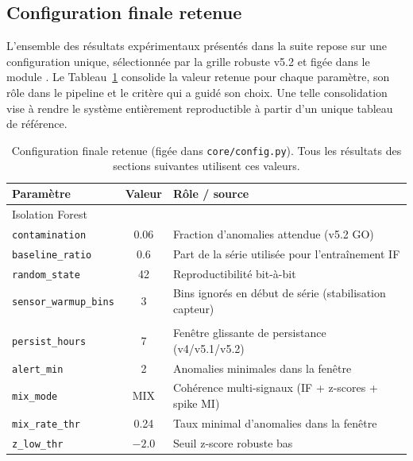\subsection{Configuration finale retenue}

L'ensemble des résultats expérimentaux présentés dans la suite repose sur une
configuration unique, sélectionnée par la grille robuste v5.2 et figée dans le module
. Le Tableau~\ref{tab:configuration_finale} consolide la valeur
retenue pour chaque paramètre, son rôle dans le pipeline et le critère qui a guidé son choix.
Une telle consolidation vise à rendre le système entièrement reproductible à partir d'un
unique tableau de référence.

\begin{table}[H]
    \centering
    \caption{Configuration finale retenue (figée dans \texttt{core/config.py}).
    Tous les résultats des sections suivantes utilisent ces valeurs.}
    \label{tab:configuration_finale}
    \small
    \begin{tabular}{lcl}
        \toprule
        \textbf{Paramètre} & \textbf{Valeur} & \textbf{Rôle / source} \\
        \midrule
        \multicolumn{3}{l}{Isolation Forest} \\
        \texttt{contamination}        & 0.06   & Fraction d'anomalies attendue (v5.2 GO) \\
        \texttt{baseline\_ratio}      & 0.6    & Part de la série utilisée pour l'entraînement IF \\
        \texttt{random\_state}        & 42     & Reproductibilité bit-à-bit \\
        \texttt{sensor\_warmup\_bins} & 3      & Bins ignorés en début de série (stabilisation capteur) \\
        \addlinespace
        \multicolumn{3}{l}{\textit{Règles métier (épisodes)}} \\
        \texttt{persist\_hours}       & 7      & Fenêtre glissante de persistance (v4/v5.1/v5.2) \\
        \texttt{alert\_min}           & 2      & Anomalies minimales dans la fenêtre \\
        \texttt{mix\_mode}             & MIX    & Cohérence multi-signaux (IF + z-scores + spike MI) \\
        \texttt{mix\_rate\_thr}       & 0.24   & Taux minimal d'anomalies dans la fenêtre \\
        \texttt{z\_low\_thr}          & $-2.0$ & Seuil z-score robuste bas \\

\end{tabular}
\end{table}
